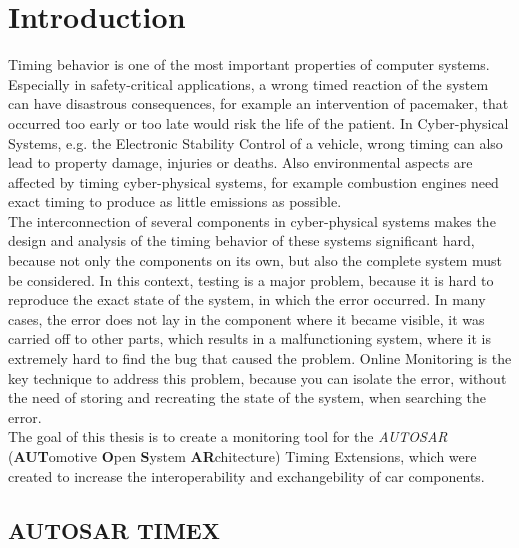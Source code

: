 
\chapter{Introduction}

Timing behavior is one of the most important properties of computer systems. Especially in safety-critical applications, a wrong timed reaction of the system can have disastrous consequences, for example an intervention of pacemaker, that occurred too early or too late would risk the life of the patient. In Cyber-physical Systems, e.g. the Electronic Stability Control of a vehicle, wrong timing can also lead to property damage, injuries or deaths. Also environmental aspects are affected by timing cyber-physical systems, for example combustion engines need exact timing to produce as little emissions as possible.\\
The interconnection of several components in cyber-physical systems makes the design and analysis of the timing behavior of these systems significant hard, because not only the components on its own, but also the complete system must be considered. In this context, testing is a major problem, because it is hard to reproduce the exact state of the system, in which the error occurred. In many cases, the error does not lay in the component where it became visible, it was carried off to other parts, which results in a malfunctioning system, where it is extremely hard to find the bug that caused the problem. Online Monitoring is the key technique to address this problem, because you can isolate the error, without the need of storing and recreating the state of the system, when searching the error.\\
The goal of this thesis is to create a monitoring tool for the \emph{AUTOSAR} (\textbf{AUT}omotive \textbf{O}pen \textbf{S}ystem \textbf{AR}chitecture) Timing Extensions, which were created to increase the interoperability and exchangebility of car components.

\section{AUTOSAR TIMEX}


